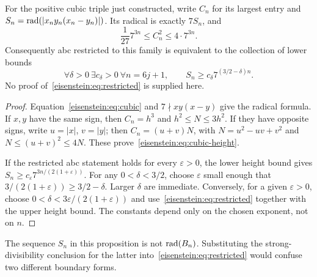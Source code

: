 \begin{proposition}\label{eisenstein:prop:coupled}
For the positive cubic triple just constructed, write $C_n$ for its largest entry and $S_n=\operatorname{rad}(|x_ny_n(x_n-y_n)|)$. Its radical is exactly $7S_n$, and
\begin{equation}\label{eisenstein:eq:cubic-height}
\frac1{27}7^{3n}\le C_n^2\le4\cdot7^{3n}.
\end{equation}
Consequently abc restricted to this family is equivalent to the collection of lower bounds
\begin{equation}\label{eisenstein:eq:restricted}
\forall\delta>0\ \exists c_\delta>0\ \forall n=6j+1,\qquad
S_n\ge c_\delta7^{(3/2-\delta)n}.
\end{equation}
No proof of~\eqref{eisenstein:eq:restricted} is supplied here.
\end{proposition}
\begin{proof}
Equation~\eqref{eisenstein:eq:cubic} and $7\nmid xy(x-y)$ give the radical formula. If $x,y$ have the same sign, then $C_n=h^3$ and $h^2\le N\le3h^2$. If they have opposite signs, write $u=|x|$, $v=|y|$; then $C_n=(u+v)N$, with
$N=u^2-uv+v^2$ and $N\le(u+v)^2\le4N$. These prove~\eqref{eisenstein:eq:cubic-height}.

If the restricted abc statement holds for every $\varepsilon>0$, the lower height bound gives
$S_n\ge c_\varepsilon7^{3n/(2(1+\varepsilon))}$. For any $0<\delta<3/2$, choose $\varepsilon$ small enough that $3/(2(1+\varepsilon))\ge3/2-\delta$. Larger $\delta$ are immediate. Conversely, for a given $\varepsilon>0$, choose $0<\delta<3\varepsilon/(2(1+\varepsilon))$ and use~\eqref{eisenstein:eq:restricted} together with the upper height bound. The constants depend only on the chosen exponent, not on $n$.
\end{proof}
The sequence $S_n$ in this proposition is not $\operatorname{rad}(B_n)$. Substituting the strong-divisibility conclusion for the latter into~\eqref{eisenstein:eq:restricted} would confuse two different boundary forms.

